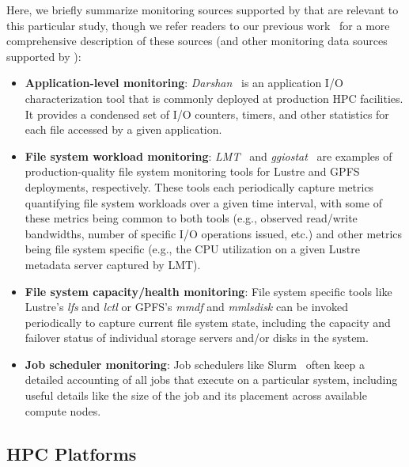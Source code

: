 Here, we briefly summarize monitoring sources supported by \tokio that are relevant to this particular study, though we refer readers to our previous work~\cite{Lockwood2017, Lockwood2018tokio} for a more comprehensive description of these sources (and other monitoring data sources supported by \tokio):

\begin{itemize}[leftmargin=*]
\item \textbf{Application-level monitoring}: \textit{Darshan}~\cite{Carns2009} is an application I/O characterization tool that is commonly deployed at production HPC facilities. It provides a condensed set of I/O counters, timers, and other statistics for each file accessed by a given application.

\item \textbf{File system workload monitoring}: \textit{LMT}~\cite{lmt} and \textit{ggiostat}~\cite{Lockwood2017} are examples of 
production-quality file system monitoring tools for Lustre and GPFS deployments, respectively. These tools each periodically capture metrics quantifying file system workloads over a given time interval, with some of these metrics being common to both tools (e.g., observed read/write bandwidths, number of specific I/O operations issued, etc.) and other metrics being file system specific (e.g., the CPU utilization on a given Lustre metadata server captured by LMT).

\item \textbf{File system capacity/health monitoring}: File system specific tools like Lustre's \textit{lfs} and \textit{lctl} or GPFS's \textit{mmdf} and \textit{mmlsdisk} can be invoked periodically to capture current file system state, including the capacity and failover status of individual storage servers and/or disks in the system.

\item \textbf{Job scheduler monitoring}: Job schedulers like Slurm~\cite{2003slurm} often keep a detailed accounting of all jobs that execute on a particular system, including useful details like the size of the job and its placement across available compute nodes.
\end{itemize}


\subsection{HPC Platforms}\label{sec:methods/platforms}

